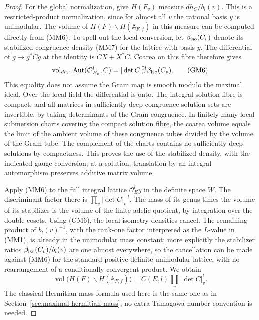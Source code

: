 \begin{proof}
For the global normalization, give \(H(F_v)\) measure
\(dh_C/b_l(v)\). This is a restricted-product
normalization, since for almost all \(v\) the rational
basis \(y\) is unimodular. The volume of
\(H(F)\backslash H(\mathbb A_{F,f})\) in this measure
can be computed directly from (MM6). To spell out
the local conversion, let \(\beta_{\rm iso}(C_v)\)
denote its stabilized congruence density (MM7) for the
lattice with basis \(y\). The differential of
\(g\mapsto g^*Cg\) at the identity is \(CX+X^*C\).
Coarea on this fibre therefore gives
\[
 \operatorname{vol}_{dh_C}\operatorname{Aut}(\mathcal O_{E_v}^l,C)
              =|\det C|_v^{2l}\beta_{\rm iso}(C_v).
 \tag{GM6}
\]
This equality does not assume the Gram map is smooth
modulo the maximal ideal. Over the local field the
differential is onto. The integral solution fibre is
compact, and all matrices in sufficiently deep
congruence solution sets are invertible, by taking
determinants of the Gram congruence. In finitely many
local submersion charts covering the compact solution
fibre, the coarea volume equals the limit of the
ambient volume of these congruence tubes divided by
the volume of the Gram tube. The complement of the
charts contains no sufficiently deep solutions by
compactness. This proves the use of the stabilized
density, with the indicated gauge conversion; at a
solution, translation by an integral automorphism
preserves additive matrix volume.

Apply (MM6) to the full integral lattice
\(\mathcal O_E^l y\) in the definite space \(W\).
The discriminant factor there is
\(\prod_v|\det C|_v^{-l}\).
The mass of its genus times the volume of its
stabilizer is the volume of the finite adelic
quotient, by integration over the double cosets.
Using (GM6), the local isometry densities cancel.
The remaining product of \(b_l(v)^{-1}\), with
the rank-one factor interpreted as the \(L\)-value
in (MM1), is already in the unimodular mass
constant; more explicitly the stabilizer ratios
\(\beta_{\rm iso}(C_v)/b_l(v)\) are one almost
everywhere, so the cancellation can be made against
(MM6) for the standard positive definite unimodular
lattice, with no rearrangement of a conditionally
convergent product. We obtain
\[
 \operatorname{vol}\bigl(H(F)\backslash H(\mathbb A_{F,f})\bigr)
              =C(E,l)\prod_v|\det C|_v^l .
 \tag{GM7}
\]
The classical Hermitian mass formula used here is the
same one as in Section~\ref{sec:maximal-hermitian-mass};
no extra Tamagawa-number convention is needed.


\end{proof}
